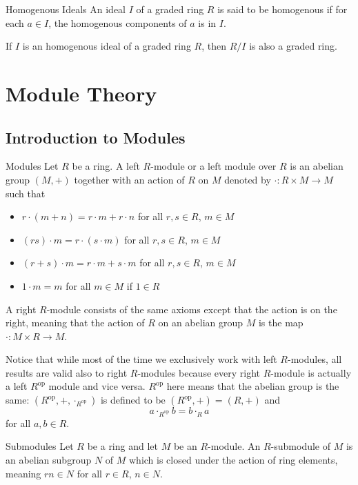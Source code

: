 \documentclass[a4paper]{article}
\begin{document}
\begin{defn}{Homogenous Ideals}{} An ideal $I$ of a graded ring $R$ is said to be homogenous if for each $a\in I$, the homogenous components of $a$ is in $I$. 
\end{defn}

\begin{prp}{}{} If $I$ is an homogenous ideal of a graded ring $R$, then $R/I$ is also a graded ring. 
\end{prp}

\pagebreak
\section{Module Theory}
\subsection{Introduction to Modules}
\begin{defn}{Modules}{} Let $R$ be a ring. A left $R$-module or a left module over $R$ is an abelian group $(M,+)$ together with an action of $R$ on $M$ denoted by $\cdot:R\times M\to M$ such that 
\begin{itemize}
\item $r\cdot (m+n)=r\cdot m+r\cdot n$ for all $r,s\in R$, $m\in M$
\item $(rs)\cdot m=r\cdot (s\cdot m)$ for all $r,s\in R$, $m\in M$
\item $(r+s)\cdot m=r\cdot m+s\cdot m$ for all $r,s\in R$, $m\in M$
\item $1\cdot m=m$ for all $m\in M$ if $1\in R$
\end{itemize}
A right $R$-module consists of the same axioms except that the action is on the right, meaning that the action of $R$ on an abelian group $M$ is the map $\cdot:M\times R\to M$. 
\end{defn}

Notice that while most of the time we exclusively work with left $R$-modules, all results are valid also to right $R$-modules because every right $R$-module is actually a left $R^{\text{op}}$ module and vice versa. $R^{\text{op}}$ here means that the abelian group is the same: $(R^{\text{op}},+,\cdot_{R^\text{op}})$ is defined to be $(R^\text{op},+)=(R,+)$ and $$a\cdot_{R^{\text{op}}}b=b\cdot_R a$$ for all $a,b\in R$. 

\begin{defn}{Submodules}{} Let $R$ be a ring and let $M$ be an $R$-module. An $R$-submodule of $M$ is an abelian subgroup $N$ of $M$ which is closed under the action of ring elements, meaning $rn\in N$ for all $r\in R$, $n\in N$. 
\end{defn}
\end{document}

